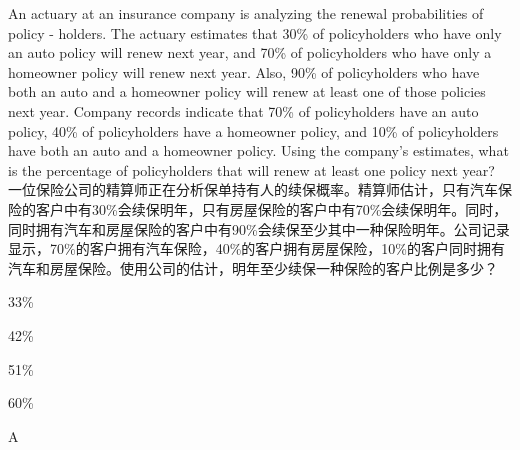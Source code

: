 \documentclass{article}
\newcounter{question} %
\begin{document}
\begin{question}
    An actuary at an insurance company is analyzing the renewal probabilities of policy - holders. The actuary estimates that 30\% of policyholders who have only an auto policy will renew next year, and 70\% of policyholders who have only a homeowner policy will renew next year. Also, 90\% of policyholders who have both an auto and a homeowner policy will renew at least one of those policies next year. Company records indicate that 70\% of policyholders have an auto policy, 40\% of policyholders have a homeowner policy, and 10\% of policyholders have both an auto and a homeowner policy. Using the company's estimates, what is the percentage of policyholders that will renew at least one policy next year?\\
    一位保险公司的精算师正在分析保单持有人的续保概率。精算师估计，只有汽车保险的客户中有30\%会续保明年，只有房屋保险的客户中有70\%会续保明年。同时，同时拥有汽车和房屋保险的客户中有90\%会续保至少其中一种保险明年。公司记录显示，70\%的客户拥有汽车保险，40\%的客户拥有房屋保险，10\%的客户同时拥有汽车和房屋保险。使用公司的估计，明年至少续保一种保险的客户比例是多少？
    \end{question}
    
    \begin{choices}
        \item 33\%
        \item 42\%
        \item 51\%
        \item 60\%
    \end{choices}
    
    \begin{correctanswer}
        A
    \end{correctanswer}
    
\end{document}
